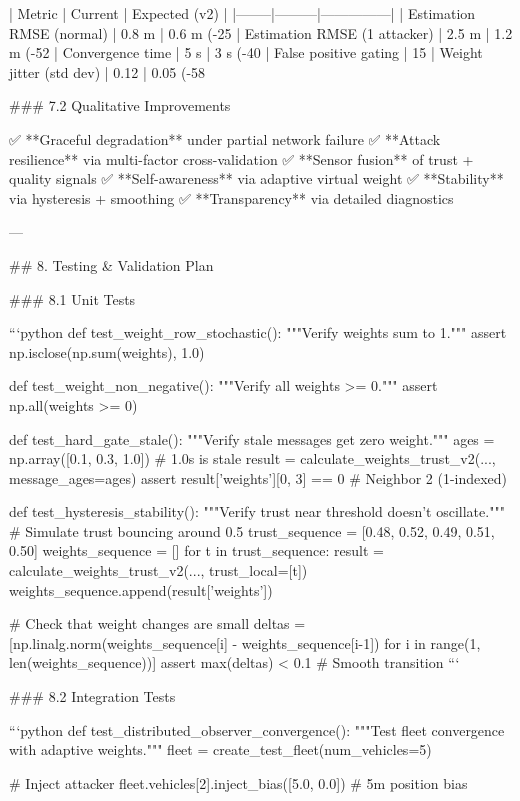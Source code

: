 | Metric | Current | Expected (v2) |
|--------|---------|---------------|
| Estimation RMSE (normal) | 0.8 m | 0.6 m (-25%
| Estimation RMSE (1 attacker) | 2.5 m | 1.2 m (-52%
| Convergence time | 5 s | 3 s (-40%
| False positive gating | 15%
| Weight jitter (std dev) | 0.12 | 0.05 (-58%

### 7.2 Qualitative Improvements

✅ **Graceful degradation** under partial network failure  
✅ **Attack resilience** via multi-factor cross-validation  
✅ **Sensor fusion** of trust + quality signals  
✅ **Self-awareness** via adaptive virtual weight  
✅ **Stability** via hysteresis + smoothing  
✅ **Transparency** via detailed diagnostics  

---

## 8. Testing & Validation Plan

### 8.1 Unit Tests

```python
def test_weight_row_stochastic():
    """Verify weights sum to 1."""
    assert np.isclose(np.sum(weights), 1.0)

def test_weight_non_negative():
    """Verify all weights >= 0."""
    assert np.all(weights >= 0)

def test_hard_gate_stale():
    """Verify stale messages get zero weight."""
    ages = np.array([0.1, 0.3, 1.0])  # 1.0s is stale
    result = calculate_weights_trust_v2(..., message_ages=ages)
    assert result['weights'][0, 3] == 0  # Neighbor 2 (1-indexed)

def test_hysteresis_stability():
    """Verify trust near threshold doesn't oscillate."""
    # Simulate trust bouncing around 0.5
    trust_sequence = [0.48, 0.52, 0.49, 0.51, 0.50]
    weights_sequence = []
    for t in trust_sequence:
        result = calculate_weights_trust_v2(..., trust_local=[t])
        weights_sequence.append(result['weights'])
    
    # Check that weight changes are small
    deltas = [np.linalg.norm(weights_sequence[i] - weights_sequence[i-1]) 
              for i in range(1, len(weights_sequence))]
    assert max(deltas) < 0.1  # Smooth transition
```

### 8.2 Integration Tests

```python
def test_distributed_observer_convergence():
    """Test fleet convergence with adaptive weights."""
    fleet = create_test_fleet(num_vehicles=5)
    
    # Inject attacker
    fleet.vehicles[2].inject_bias([5.0, 0.0])  # 5m position bias
    
